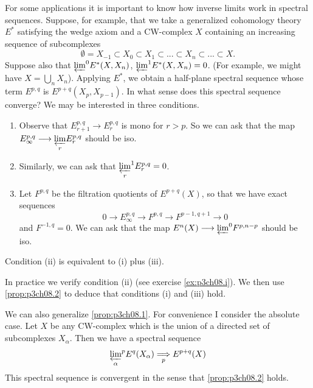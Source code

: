 \documentclass[../main]{subfiles}
\begin{document}
\par For some applications it is important to know how inverse limits work in spectral sequences. Suppose, for example, that we take a generalized cohomology theory $E^*$ satisfying the wedge axiom and a CW-complex $X$ containing an increasing sequence of subcomplexes
$$\emptyset = X_{-1}\subset X_0\subset X_1\subset ... \subset X_n\subset ... \subset X.$$
Suppose also that ${\varprojlim}^0E^*(X,X_n)$,  ${\varprojlim}^1E^*(X,X_n)=0$. (For example, we might have $X=\bigcup_nX_n$). Applying $E^*$, we obtain a half-plane spectral sequence whose term $E^{p,q}$ is $E^{p+q}(X_p, X_{p-1})$. In what sense does this spectral sequence converge? We may be interested in three conditions.
\begin{enumerate}[wide=\parindent]
    \item Observe that $E_{r+1}^{p,q}\longrightarrow E_r^{p,q}$ is mono for $r>p$. So we can ask that the map $E_\infty^{p,q}\longrightarrow \underset{r}{\varprojlim} E_r^{p,q}$ should be iso.
    \item Similarly, we can ask that $\underset{r}{\varprojlim}^1E_r^{p,q}=0$.
    \item Let $F^{p,q}$ be the filtration quotients of $E^{p+q}(X)$, so that we have exact sequences
    $$0\longrightarrow E_{\infty}^{p,q}\longrightarrow F^{p,q} \longrightarrow F^{p-1,q+1} \longrightarrow 0$$
    and $F^{-1,q}=0$. We can ask that the map $E^n(X)\longrightarrow {\varprojlim}^0F^{p,n-p}$ should be iso.
\end{enumerate}
\begin{theorem}\label{prop:p3ch08.2}
Condition (ii) is equivalent to (i) plus (iii). 
\end{theorem}
In practice we verify condition (ii) (see exercise \ref{ex:p3ch08.i}). We then use \ref{prop:p3ch08.2} to deduce that conditions (i) and (iii) hold.
\par We can also generalize \ref{prop:p3ch08.1}. For convenience I consider the absolute case. Let $X$ be any CW-complex which is the union of a directed set of subcomplexes $X_\alpha$. Then we have a spectral sequence
$${\varprojlim_\alpha}^pE^q(X_\alpha) \underset{p}{\Longrightarrow} E^{p+q}(X)$$
This spectral sequence is convergent in the sense that \ref{prop:p3ch08.2} holds.
\end{document}
